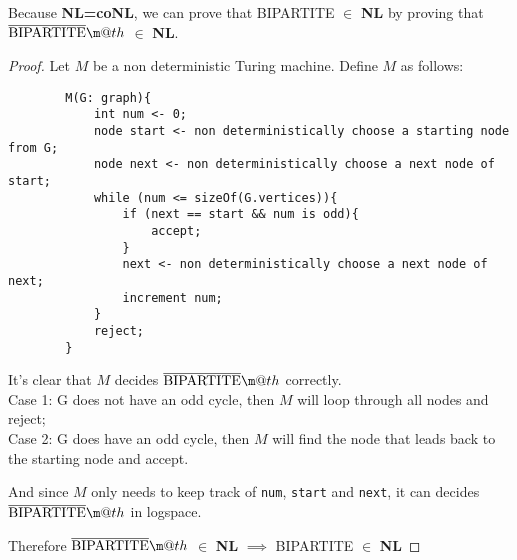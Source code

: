 \documentclass[letterpaper]{article}
\begin{document}
\makeatletter
\newcommand*{\textoverline}[1]{$\overline{\hbox{#1}}\m@th$}
\newcommand*{\textin}[1]{$\in{\hbox{#1}}\m@th$}
\makeatother
Because \textbf{NL=coNL}, we can prove that BIPARTITE $\in$ \textbf{NL} by proving that \textoverline{BIPARTITE} $\in$ \textbf{NL}.
\begin{proof}
    Let $M$ be a non deterministic Turing machine. Define $M$ as follows:
    \begin{verbatim}
        M(G: graph){
            int num <- 0;
            node start <- non deterministically choose a starting node from G;
            node next <- non deterministically choose a next node of start;
            while (num <= sizeOf(G.vertices)){
                if (next == start && num is odd){
                    accept;
                }
                next <- non deterministically choose a next node of next;
                increment num;
            }
            reject;
        }
    \end{verbatim}
    It's clear that $M$ decides \textoverline{BIPARTITE} correctly.\\ 
    Case 1: G does not have an odd cycle, then $M$ will loop through all nodes and reject;\\
    Case 2: G does have an odd cycle, then $M$ will find the node that leads back to the starting node and accept.

    And since $M$ only needs to keep track of
    \verb#num#, \verb#start# and \verb#next#, it can decides \textoverline{BIPARTITE} in logspace.

    Therefore \textoverline{BIPARTITE} $\in$ \textbf{NL} $\implies$ BIPARTITE $\in$ \textbf{NL}
\end{proof}
\newpage
\end{document}
